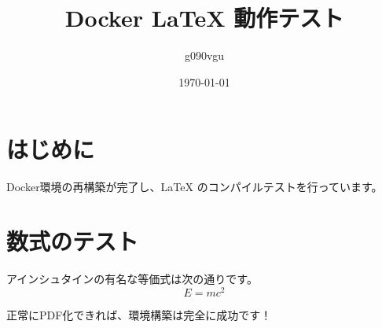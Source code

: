 \documentclass{jlreq} %
\begin{document}
\title{Docker \LaTeX{} 動作テスト}
\author{g090vgu}
\date{\today}
\maketitle

\section{はじめに}
Docker環境の再構築が完了し、\LaTeX{} のコンパイルテストを行っています。

\section{数式のテスト}
アインシュタインの有名な等価式は次の通りです。
\begin{equation}
E = mc^2
\end{equation}

正常にPDF化できれば、環境構築は完全に成功です！
\end{document}
